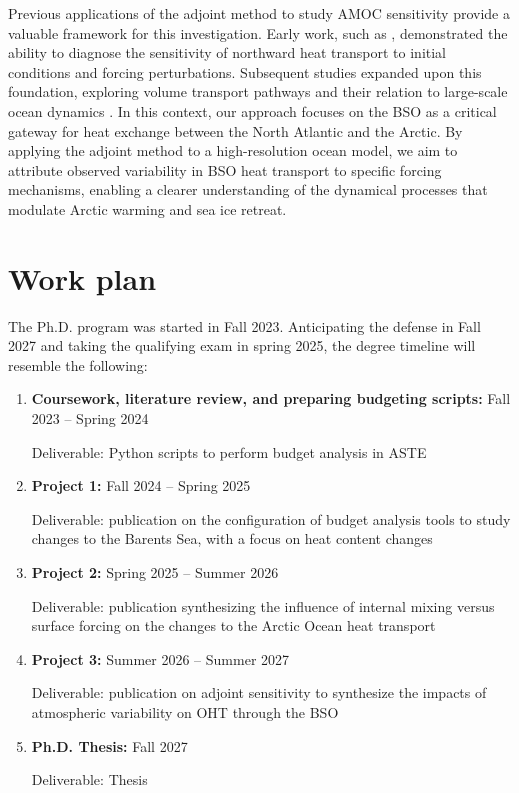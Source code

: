 \documentclass[draft]{agujournal2019}
\begin{document}
Previous applications of the adjoint method to study AMOC sensitivity provide a valuable framework for this investigation. Early work, such as , demonstrated the ability to diagnose the sensitivity of northward heat transport to initial conditions and forcing perturbations. Subsequent studies expanded upon this foundation, exploring volume transport pathways and their relation to large-scale ocean dynamics \cite{marotzke1999, bugnion2006, czeschel2010, pillar2016}. In this context, our approach focuses on the BSO as a critical gateway for heat exchange between the North Atlantic and the Arctic. By applying the adjoint method to a high-resolution ocean model, we aim to attribute observed variability in BSO heat transport to specific forcing mechanisms, enabling a clearer understanding of the dynamical processes that modulate Arctic warming and sea ice retreat.



\section{Work plan}
    The Ph.D. program was started in Fall 2023. Anticipating the defense in Fall 2027 and taking the qualifying exam in spring 2025, the degree timeline will resemble the following:

    \begin{enumerate}
        \item \textbf{Coursework, literature review, and preparing budgeting scripts:} Fall 2023 -- Spring 2024

        Deliverable: Python scripts to perform budget analysis in ASTE
        
        \item \textbf{Project 1:} Fall 2024 -- Spring 2025
        
        Deliverable: publication on the configuration of budget analysis tools to study changes to the Barents Sea, with a focus on heat content changes
        
        \item \textbf{Project 2:} Spring 2025 -- Summer 2026

        Deliverable: publication synthesizing the influence of internal mixing versus surface forcing on the changes to the Arctic Ocean heat transport 

        \item \textbf{Project 3:} Summer 2026 -- Summer 2027

        Deliverable: publication on adjoint sensitivity to synthesize the impacts of atmospheric variability on OHT through the BSO

        \item \textbf{Ph.D. Thesis:} Fall 2027

        Deliverable: Thesis
    \end{enumerate}
\end{document}
